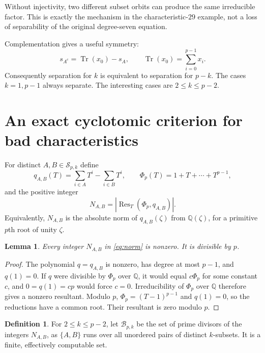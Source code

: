 \documentclass[11pt,a4paper]{article}
\newtheorem{lemma}[theorem]{Lemma}
\theoremstyle{definition}
\newtheorem{definition}[theorem]{Definition}
\theoremstyle{remark}
\newcommand{\Q}{\mathbb Q}
\newcommand{\Res}{\operatorname{Res}}
\begin{document}
Without injectivity, two different subset orbits can produce the same
irreducible factor. This is exactly the mechanism in the characteristic-$29$
example, not a loss of separability of the original degree-seven equation.

Complementation gives a useful symmetry:
\[
 s_{A^c}=\operatorname{Tr}(x_0)-s_A,
 \qquad \operatorname{Tr}(x_0)=\sum_{i=0}^{p-1}x_i.
\]
Consequently separation for $k$ is equivalent to separation for $p-k$.
The cases $k=1,p-1$ always separate. The interesting cases are
$2\leq k\leq p-2$.

\section{An exact cyclotomic criterion for bad characteristics}
\label{sec:criterion}

For distinct $A,B\in\mathcal S_{p,k}$ define
\begin{equation}
 q_{A,B}(T)=\sum_{i\in A}T^i-\sum_{i\in B}T^i,
 \qquad \Phi_p(T)=1+T+\cdots+T^{p-1},
 \label{eq:q}
\end{equation}
and the positive integer
\begin{equation}
 N_{A,B}=\left|\Res_T(\Phi_p,q_{A,B})\right|.
 \label{eq:norm}
\end{equation}
Equivalently, $N_{A,B}$ is the absolute norm of $q_{A,B}(\zeta)$ from
$\Q(\zeta)$, for a primitive $p$th root of unity $\zeta$.

\begin{lemma}\label{lem:normnonzero}
Every integer $N_{A,B}$ in \eqref{eq:norm} is nonzero. It is divisible by $p$.
\end{lemma}
\begin{proof}
The polynomial $q=q_{A,B}$ is nonzero, has degree at most $p-1$, and
$q(1)=0$. If $q$ were divisible by $\Phi_p$ over $\Q$, it would equal
$c\Phi_p$ for some constant $c$, and $0=q(1)=cp$ would force $c=0$.
Irreducibility of $\Phi_p$ over $\Q$ therefore gives a nonzero resultant.
Modulo $p$, $\Phi_p=(T-1)^{p-1}$ and $q(1)=0$, so the reductions have a
common root. Their resultant is zero modulo $p$.
\end{proof}

\begin{definition}
For $2\leq k\leq p-2$, let $\mathcal B_{p,k}$ be the set of prime divisors
of the integers $N_{A,B}$, as $\{A,B\}$ runs over all unordered pairs of
distinct $k$-subsets. It is a finite, effectively computable set.
\end{definition}
\end{document}
